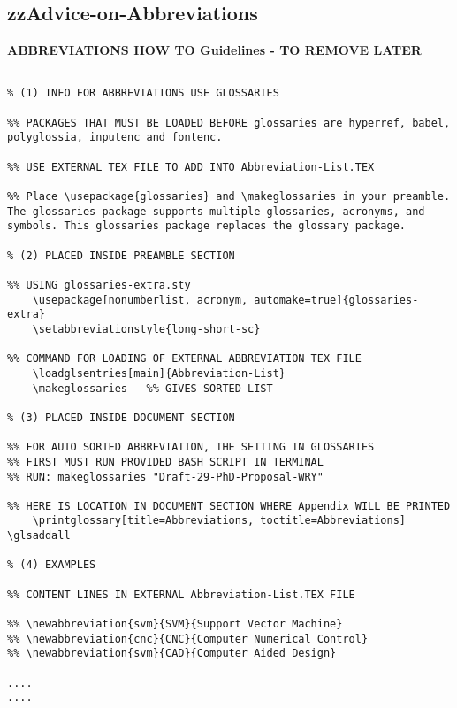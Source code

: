 \pagebreak
\begin{tcolorbox}

\section{zzAdvice-on-Abbreviations}

\textbf{ABBREVIATIONS HOW TO Guidelines - TO REMOVE LATER}	

\begin{lstlisting}[caption={zzAdvice-on-Abbreviations}, label=zzAdvice-on-Abbreviations]
	
% (1) INFO FOR ABBREVIATIONS USE GLOSSARIES

%% PACKAGES THAT MUST BE LOADED BEFORE glossaries are hyperref, babel, polyglossia, inputenc and fontenc.

%% USE EXTERNAL TEX FILE TO ADD INTO Abbreviation-List.TEX

%% Place \usepackage{glossaries} and \makeglossaries in your preamble. The glossaries package supports multiple glossaries, acronyms, and symbols. This glossaries package replaces the glossary package.

% (2) PLACED INSIDE PREAMBLE SECTION

%% USING glossaries-extra.sty
	\usepackage[nonumberlist, acronym, automake=true]{glossaries-extra}
	\setabbreviationstyle{long-short-sc}

%% COMMAND FOR LOADING OF EXTERNAL ABBREVIATION TEX FILE
	\loadglsentries[main]{Abbreviation-List}  
	\makeglossaries   %% GIVES SORTED LIST

% (3) PLACED INSIDE DOCUMENT SECTION

%% FOR AUTO SORTED ABBREVIATION, THE SETTING IN GLOSSARIES 
%% FIRST MUST RUN PROVIDED BASH SCRIPT IN TERMINAL
%% RUN: makeglossaries "Draft-29-PhD-Proposal-WRY"

%% HERE IS LOCATION IN DOCUMENT SECTION WHERE Appendix WILL BE PRINTED
	\printglossary[title=Abbreviations, toctitle=Abbreviations] \glsaddall

% (4) EXAMPLES 

%% CONTENT LINES IN EXTERNAL Abbreviation-List.TEX FILE

%% \newabbreviation{svm}{SVM}{Support Vector Machine}
%% \newabbreviation{cnc}{CNC}{Computer Numerical Control}
%% \newabbreviation{svm}{CAD}{Computer Aided Design}

....
....
\end{lstlisting}
\end{tcolorbox}
